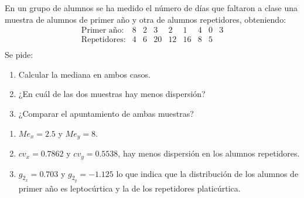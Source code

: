 {En un grupo de alumnos se ha medido el número de días que faltaron a clase una muestra de alumnos de primer año y otra de alumnos repetidores, obteniendo:
\[
\begin{array}{lcccccccc}
\mbox{Primer año:}  & 8 & 2 & 3  & 2  & 1  & 4 & 0 & 3 \\
\mbox{Repetidores:} & 4 & 6 & 20 & 12 & 16 & 8 & 5 &   \\
\end{array}
\]
Se pide:
\begin{enumerate}
\item Calcular la mediana en ambos casos.
\item ¿En cuál de las dos muestras hay menos dispersión?
\item ¿Comparar el apuntamiento de ambas muestras?
\end{enumerate}
}
{\begin{enumerate}
\item $Me_{x}=2.5$ y $Me_{y}=8$.
\item $cv_x =0.7862$ y $cv_y =0.5538$, hay menos dispersión en los alumnos repetidores. 
\item $g_{2_x} =0.703$ y $g_{2_y} =-1.125$ lo que indica que la distribución de los alumnos de primer año es leptocúrtica y la de los repetidores platicúrtica.
\end{enumerate}
}
